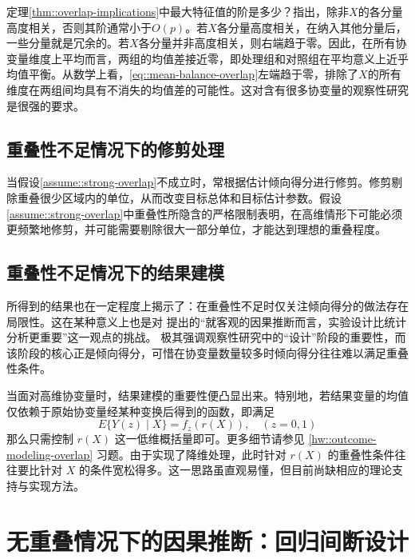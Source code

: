 定理\ref{thm::overlap-implications}中最大特征值的阶是多少？\citet{d2017overlap}指出，除非$X$的各分量高度相关，否则其阶通常小于$O(p)$。若$X$各分量高度相关，在纳入其他分量后，一些分量就是冗余的。若$X$各分量并非高度相关，则右端趋于零。因此，在所有协变量维度上平均而言，两组的均值差接近零，即处理组和对照组在平均意义上近乎均值平衡。从数学上看，\eqref{eq::mean-balance-overlap}左端趋于零，排除了$X$的所有维度在两组间均具有不消失的均值差的可能性。这对含有很多协变量的观察性研究是很强的要求。 



\subsection{重叠性不足情况下的修剪处理}\label{sec::trimming-overlap}

当假设\ref{assume::strong-overlap}不成立时，常根据估计倾向得分进行修剪\citep{crump2009dealing, yang2018asymptotic}。修剪剔除重叠很少区域内的单位，从而改变目标总体和目标估计参数。假设\ref{assume::strong-overlap}中重叠性所隐含的严格限制表明，在高维情形下可能必须更频繁地修剪，并可能需要剔除很大一部分单位，才能达到理想的重叠程度。 


\subsection{重叠性不足情况下的结果建模}\label{sec::outcome-modeling-overlap}


\citet{d2017overlap} 所得到的结果也在一定程度上揭示了：在重叠性不足时仅关注倾向得分的做法存在局限性。这在某种意义上也是对 \citet{rubin2008objective} 提出的“就客观的因果推断而言，实验设计比统计分析更重要”这一观点的挑战。\citet{rubin2008objective} 极其强调观察性研究中的“设计”阶段的重要性，而该阶段的核心正是倾向得分，可惜在协变量数量较多时倾向得分往往难以满足重叠性条件。 



当面对高维协变量时，结果建模的重要性便凸显出来。特别地，若结果变量的均值仅依赖于原始协变量经某种变换后得到的函数，即满足
$$
E\{  Y(z) \mid X \} = f_z( r(X)   ),\quad (z=0,1)
$$
那么只需控制 $r(X)$ 这一低维概括量即可。更多细节请参见 \ref{hw::outcome-modeling-overlap} 习题。由于实现了降维处理，此时针对 $r(X)$ 的重叠性条件往往要比针对 $X$ 的条件宽松得多。这一思路虽直观易懂，但目前尚缺相应的理论支持与实现方法。 



\section{无重叠情况下的因果推断：回归间断设计}
\label{sec::rdd}

